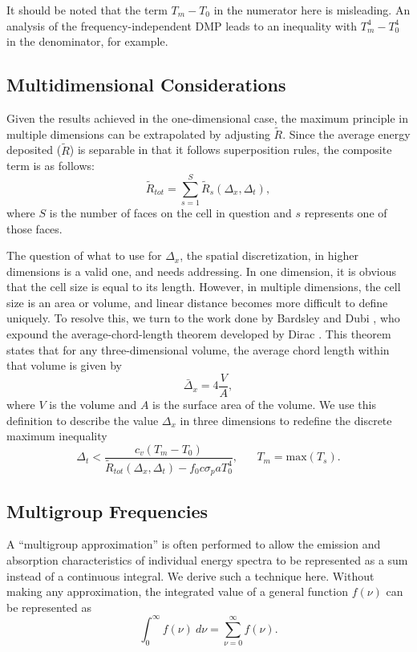 It should be noted that the term $T_m-T_0$ in the numerator here is misleading. 
An analysis of the frequency-independent DMP leads to an inequality with
$T_m^4-T_0^4$ in the denominator, for example.

\subsection{Multidimensional Considerations}
Given the results achieved in the one-dimensional case, the maximum principle in
multiple dimensions can be extrapolated by adjusting
$\tilde R$.  Since the average energy deposited ($\tilde R$) is
separable in that it follows superposition rules, the composite term is as
follows:
\begin{equation}
\tilde R_{tot} = \sum_{s=1}^S \tilde R_s(\Delta_x,\Delta_t),
\end{equation}
where $S$ is the number of faces on the cell in question and $s$ represents one
of those faces.

The question of what to use for $\Delta_x$, the spatial discretization, in
higher dimensions is a valid one, and needs addressing.  In one dimension, it is
obvious that the cell size is equal to its length. However, in multiple
dimensions, the cell size is an area or volume, and linear distance
becomes more difficult to define uniquely.  To resolve this, we turn to the work
done by Bardsley and Dubi \cite{BardDub}, who expound the average-chord-length
theorem developed by Dirac \cite{Dirac}. This theorem states that for any
three-dimensional volume, the average chord length within that volume is given
by
\begin{equation}
\bar\Delta_x = 4\frac{V}{A},
\end{equation}
where $V$ is the volume and $A$ is the surface area of the volume.  We use this
definition to describe the value $\Delta_x$ in three dimensions to redefine the
discrete maximum inequality
\begin{equation}
\Delta_t<\frac{c_v(T_m-T_0)}{\tilde R_{tot}(\Delta_x,\Delta_t)-
  f_0c\sigma_paT_0^4},  \hspace{20pt} T_m=\mbox{max}(T_s).\label{FINAL dmp}
\end{equation}
\belowSubSecSkip



%
%
\aboveSubSecSkip
\subsection{Multigroup Frequencies}
 A ``multigroup approximation'' is often
performed to allow the emission and absorption characteristics of individual energy spectra
to be represented as a sum instead of a continuous integral.  We derive such a
technique here.  Without making
any approximation, the integrated value of a general function $f(\nu)$ can be
represented as
\[\int_0^\infty f(\nu)\ d\nu = \sum_{\nu=0}^\infty f(\nu).\]

